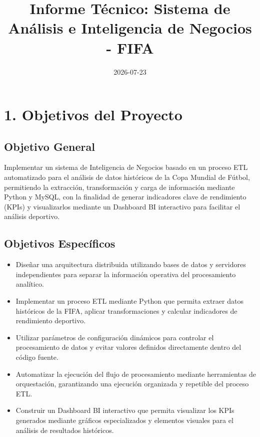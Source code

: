 \documentclass[
  letterpaper,
  DIV=11,
  numbers=noendperiod]{scrartcl}
\title{Informe Técnico: Sistema de Análisis e Inteligencia de Negocios -
FIFA}
\author{}
\date{2026-07-23}
\renewcommand*\contentsname{Table of contents}
\newcommand\contentsname{Table of contents}
\begin{document}
\maketitle

\renewcommand*\contentsname{Table of contents}
{
\hypersetup{linkcolor=}
\setcounter{tocdepth}{3}
\tableofcontents
}
\section{1. Objetivos del Proyecto}\label{objetivos-del-proyecto}

\subsection{Objetivo General}\label{objetivo-general}

Implementar un sistema de Inteligencia de Negocios basado en un proceso
ETL automatizado para el análisis de datos históricos de la Copa Mundial
de Fútbol, permitiendo la extracción, transformación y carga de
información mediante Python y MySQL, con la finalidad de generar
indicadores clave de rendimiento (KPIs) y visualizarlos mediante un
Dashboard BI interactivo para facilitar el análisis deportivo.

\subsection{Objetivos Específicos}\label{objetivos-especuxedficos}

\begin{itemize}
\item
  Diseñar una arquitectura distribuida utilizando bases de datos y
  servidores independientes para separar la información operativa del
  procesamiento analítico.
\item
  Implementar un proceso ETL mediante Python que permita extraer datos
  históricos de la FIFA, aplicar transformaciones y calcular indicadores
  de rendimiento deportivo.
\item
  Utilizar parámetros de configuración dinámicos para controlar el
  procesamiento de datos y evitar valores definidos directamente dentro
  del código fuente.
\item
  Automatizar la ejecución del flujo de procesamiento mediante
  herramientas de orquestación, garantizando una ejecución organizada y
  repetible del proceso ETL.
\item
  Construir un Dashboard BI interactivo que permita visualizar los KPIs
  generados mediante gráficos especializados y elementos visuales para
  el análisis de resultados históricos.
\end{itemize}
\end{document}
